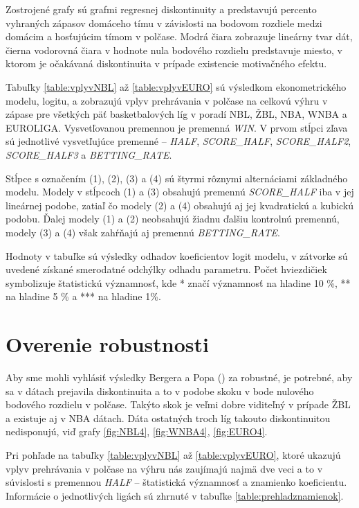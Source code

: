 \documentclass[
  digital, %
  oneside, %
  notable,   %
  lof,     %
  lot,     %
]{fithesis3}
\begin{document}
	Zostrojené grafy sú grafmi regresnej diskontinuity a predstavujú percento vyhraných zápasov domáceho tímu v závislosti na bodovom rozdiele medzi domácim a hosťujúcim tímom v polčase. Modrá čiara zobrazuje lineárny tvar dát, čierna vodorovná čiara v hodnote nula bodového rozdielu predstavuje miesto, v ktorom je očakávaná diskontinuita v prípade existencie motivačného efektu.

	Tabuľky \ref{table:vplyvNBL} až \ref{table:vplyvEURO} sú výsledkom ekonometrického modelu, logitu, a zobrazujú vplyv prehrávania v polčase na celkovú výhru v zápase pre všetkých päť basketbalových líg v poradí NBL, ŽBL, NBA, WNBA a EUROLIGA. Vysvetľovanou premennou je premenná \textit{WIN}. V prvom stĺpci zľava sú jednotlivé vysvetľujúce premenné – \textit{HALF}, \textit{SCORE\_HALF}, \textit{SCORE\_HALF2}, \textit{SCORE\_HALF3} a \textit{BETTING\_RATE}. 

	Stĺpce s označením (1), (2), (3) a (4) sú štyrmi rôznymi alternáciami základného modelu. Modely v stĺpcoch (1) a (3) obsahujú premennú \textit{SCORE\_HALF} iba v jej lineárnej podobe, zatiaľ čo modely (2) a (4) obsahujú aj jej kvadratickú a kubickú podobu. Ďalej modely (1) a (2) neobsahujú žiadnu ďalšiu kontrolnú premennú, modely (3) a (4) však zahŕňajú aj premennú \textit{BETTING\_RATE}. 
	
	Hodnoty v tabuľke sú výsledky odhadov koeficientov logit modelu, v zátvorke sú uvedené získané smerodatné odchýlky odhadu parametru. Počet hviezdičiek symbolizuje štatistickú významnosť, kde * značí významnosť na hladine 10 \%, ** na hladine 5 \% a *** na hladine 1\%.

	\section{Overenie robustnosti}
	\label{sec:overenie}
	Aby sme mohli vyhlásiť výsledky Bergera a Popa (\citeyear{berger2011}) za robustné, je potrebné, aby sa v dátach prejavila diskontinuita a to v podobe skoku v bode nulového bodového rozdielu v polčase. Takýto skok je veľmi dobre viditeľný v prípade ŽBL a existuje aj v NBA dátach. Dáta ostatných troch líg takouto diskontinuitou nedisponujú, viď grafy \ref{fig:NBL4}, \ref{fig:WNBA4}, \ref{fig:EURO4}. 
	
	Pri pohľade na tabuľky \ref{table:vplyvNBL} až \ref{table:vplyvEURO}, ktoré ukazujú vplyv prehrávania v polčase na výhru nás zaujímajú najmä dve veci a to v súvislosti s premennou \textit{HALF} – štatistická významnosť a znamienko koeficientu. Informácie o jednotlivých ligách sú zhrnuté v tabuľke \ref{table:prehladznamienok}. 
	
\end{document}
